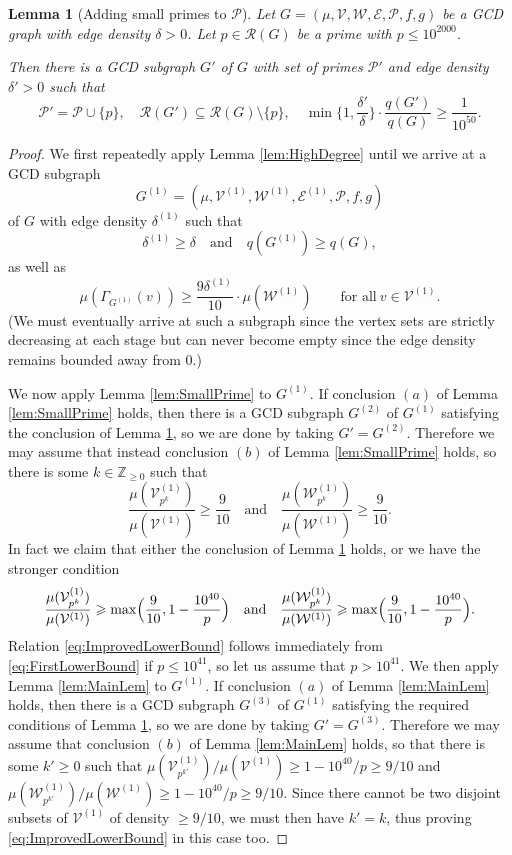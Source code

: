 \documentclass[12pt]{amsart}
\numberwithin{equation}{section}
\newtheorem{lem}{Lemma}[section]
\theoremstyle{definition}
\theoremstyle{remark}
\newcommand{\CE}{\mathcal{E}}
\newcommand{\CP}{\mathcal{P}}
\newcommand{\CR}{\mathcal{R}}
\newcommand{\CV}{\mathcal{V}}
\newcommand{\CW}{\mathcal{W}}
\renewcommand{\le}{\leqslant}
\renewcommand{\ge}{\geqslant}
\begin{document}
\begin{lem}[Adding small primes to $\CP$]\label{lem:SmallIteration}
Let $G=(\mu,\CV,\CW,\CE,\CP,f,g)$ be a GCD graph with edge density $\delta>0$. Let $p\in\CR(G)$ be a prime with $p\le 10^{2000}$.

Then there is a GCD subgraph $G'$ of $G$ with set of primes $\CP'$ and edge density $\delta'>0$ such that 
\[
\CP'=\CP\cup\{p\},
\quad \CR(G')\subseteq\CR(G)\setminus\{p\},
\quad 
\min\bigg\{1,\frac{\delta'}{\delta}\bigg\}\cdot \frac{q(G')}{q(G)}\ge \frac{1}{10^{50}}.
\]
\end{lem}
\begin{proof}
We first repeatedly apply Lemma \ref{lem:HighDegree} until we arrive at a GCD subgraph 
\[
G^{(1)}=(\mu,\CV^{(1)},\CW^{(1)},\CE^{(1)},\CP,f,g)
\]
of $G$ with edge density $\delta^{(1)}$ such that 
\[
\delta^{(1)}\ge \delta
\quad\text{and}\quad
q(G^{(1)})\ge q(G),
\]
as well as 
\[
\mu(\Gamma_{G^{(1)}}(v))\ge \frac{9\delta^{(1)}}{10}\cdot \mu(\CW^{(1)})
\qquad\text{for all}\  v\in \CV^{(1)}.
\] 
(We must eventually arrive at such a subgraph since the vertex sets are strictly decreasing at each stage but can never become empty since the edge density remains bounded away from 0.)

We now apply Lemma \ref{lem:SmallPrime} to $G^{(1)}$. If conclusion $(a)$ of Lemma \ref{lem:SmallPrime} holds, then there is a GCD subgraph $G^{(2)}$ of $G^{(1)}$ satisfying the conclusion of Lemma \ref{lem:SmallIteration}, so we are done by taking $G'=G^{(2)}$. Therefore we may assume that instead conclusion $(b)$ of Lemma \ref{lem:SmallPrime} holds, so there is some $k\in\mathbb{Z}_{\ge 0}$ such that 
\begin{equation}\label{eq:FirstLowerBound}
\frac{\mu(\CV^{(1)}_{p^k})}{\mu(\CV^{(1)})}\ge \frac{9}{10}
\quad\text{and}\quad
\frac{\mu(\CW^{(1)}_{p^k})}{\mu(\CW^{(1)})}\ge \frac{9}{10}.
\end{equation}
In fact we claim that either the conclusion of Lemma \ref{lem:SmallIteration} holds, or we have the stronger condition
\begin{equation}\label{eq:ImprovedLowerBound}
\frac{\mu(\CV^{(1)}_{p^k})}{\mu(\CV^{(1)})}\ge \max\Bigl(\frac{9}{10},1-\frac{10^{40}}{p}\Bigr)
\quad\text{and}\quad
\frac{\mu(\CW^{(1)}_{p^k})}{\mu(\CW^{(1)})}\ge \max\Bigl(\frac{9}{10},1-\frac{10^{40}}{p}\Bigr).
\end{equation}
Relation \eqref{eq:ImprovedLowerBound} follows immediately from \eqref{eq:FirstLowerBound} if $p\le 10^{41}$, so let us assume that $p>10^{41}$. We then apply Lemma \ref{lem:MainLem} to $G^{(1)}$. If conclusion $(a)$ of Lemma \ref{lem:MainLem} holds, then there is a GCD subgraph $G^{(3)}$ of $G^{(1)}$ satisfying the required conditions of Lemma \ref{lem:SmallIteration}, so we are done by taking $G'=G^{(3)}$. Therefore we may assume that conclusion $(b)$ of Lemma \ref{lem:MainLem} holds, so that there is some $k'\ge0$ such that $\mu(\CV^{(1)}_{p^{k'}})/\mu(\CV^{(1)})\ge 1-10^{40}/p\ge 9/10$ and $\mu(\CW^{(1)}_{p^{k'}})/\mu(\CW^{(1)}) \ge 1-10^{40}/p\ge 9/10$. Since there cannot be two disjoint subsets of $\CV^{(1)}$ of density $\ge9/10$, we must then have $k'=k$, thus proving \eqref{eq:ImprovedLowerBound} in this case too. 


\end{proof}
\end{document}
